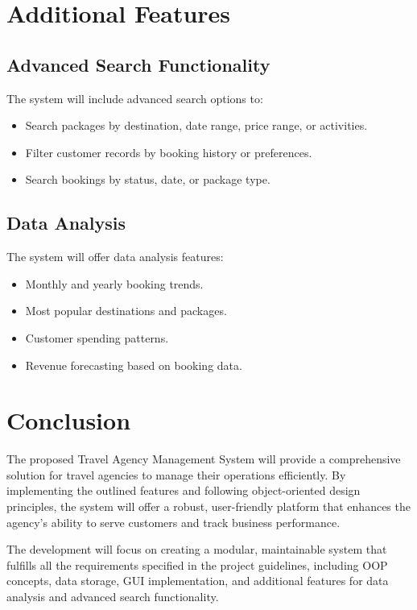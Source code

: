 \documentclass[12pt]{article}
\begin{document}
\section{Additional Features}

\subsection{Advanced Search Functionality}
The system will include advanced search options to:
\begin{itemize}
    \item Search packages by destination, date range, price range, or activities.
    \item Filter customer records by booking history or preferences.
    \item Search bookings by status, date, or package type.
\end{itemize}

\subsection{Data Analysis}
The system will offer data analysis features:
\begin{itemize}
    \item Monthly and yearly booking trends.
    \item Most popular destinations and packages.
    \item Customer spending patterns.
    \item Revenue forecasting based on booking data.
\end{itemize}

\section{Conclusion}
The proposed Travel Agency Management System will provide a comprehensive solution for travel agencies to manage their operations efficiently. By implementing the outlined features and following object-oriented design principles, the system will offer a robust, user-friendly platform that enhances the agency's ability to serve customers and track business performance.

The development will focus on creating a modular, maintainable system that fulfills all the requirements specified in the project guidelines, including OOP concepts, data storage, GUI implementation, and additional features for data analysis and advanced search functionality.
\end{document}
